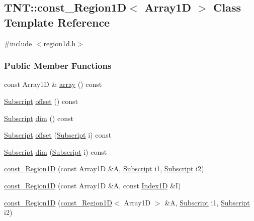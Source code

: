 \subsection{TNT::const\_\-Region1D$<$ Array1D $>$ Class Template Reference}
\label{class_t_n_t_1_1const___region1_d}


{\ttfamily \#include $<$region1d.h$>$}

\subsubsection*{Public Member Functions}
\begin{DoxyCompactItemize}
\item 
const Array1D \& \hyperlink{class_t_n_t_1_1const___region1_d_a372c514015943a9fdbc192e8a144de16}{array} () const 
\item 
\hyperlink{namespace_t_n_t_af22e3f1460e145c04ce4e7d701e4c1c1}{Subscript} \hyperlink{class_t_n_t_1_1const___region1_d_a95ad5bdc7c1d7085663eca9e6459643c}{offset} () const 
\item 
\hyperlink{namespace_t_n_t_af22e3f1460e145c04ce4e7d701e4c1c1}{Subscript} \hyperlink{class_t_n_t_1_1const___region1_d_a3cdf8823febbeafe15bb48b360be4551}{dim} () const 
\item 
\hyperlink{namespace_t_n_t_af22e3f1460e145c04ce4e7d701e4c1c1}{Subscript} \hyperlink{class_t_n_t_1_1const___region1_d_a23a443da95623a197250dd9040f6e37f}{offset} (\hyperlink{namespace_t_n_t_af22e3f1460e145c04ce4e7d701e4c1c1}{Subscript} i) const 
\item 
\hyperlink{namespace_t_n_t_af22e3f1460e145c04ce4e7d701e4c1c1}{Subscript} \hyperlink{class_t_n_t_1_1const___region1_d_ababa4b74288c6dbbadebcab4ad0c0ad6}{dim} (\hyperlink{namespace_t_n_t_af22e3f1460e145c04ce4e7d701e4c1c1}{Subscript} i) const 
\item 
\hyperlink{class_t_n_t_1_1const___region1_d_a0828cd36c860ca29410e9d8fdab99b3a}{const\_\-Region1D} (const Array1D \&A, \hyperlink{namespace_t_n_t_af22e3f1460e145c04ce4e7d701e4c1c1}{Subscript} i1, \hyperlink{namespace_t_n_t_af22e3f1460e145c04ce4e7d701e4c1c1}{Subscript} i2)
\item 
\hyperlink{class_t_n_t_1_1const___region1_d_a2c3874a61fff1f12e29ebb3aa77d7c5e}{const\_\-Region1D} (const Array1D \&A, const \hyperlink{class_t_n_t_1_1_index1_d}{Index1D} \&I)
\item 
\hyperlink{class_t_n_t_1_1const___region1_d_a050b72fcdb2d0adcfd1e46156d816045}{const\_\-Region1D} (\hyperlink{class_t_n_t_1_1const___region1_d}{const\_\-Region1D}$<$ Array1D $>$ \&A, \hyperlink{namespace_t_n_t_af22e3f1460e145c04ce4e7d701e4c1c1}{Subscript} i1, \hyperlink{namespace_t_n_t_af22e3f1460e145c04ce4e7d701e4c1c1}{Subscript} i2)

\end{DoxyCompactItemize}
